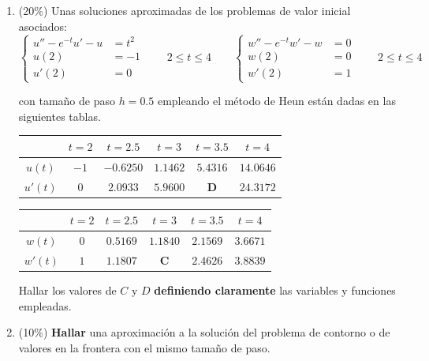 \documentclass[11pt]{article}
\begin{document}
\begin{enumerate}
\begin{enumerate}
\vspace{3cm}

\item{} (20\%) Unas soluciones aproximadas de los problemas de valor inicial asociados:
\[
\left\{
\begin{aligned}
u''-e^{-t}u'-u &= t^2\\
u(2)&=-1\\
u'(2)&=0
\end{aligned}
\right.
\qquad 2\leq t\leq 4
\qquad
\left\{
\begin{aligned}
w''-e^{-t}w'-w &= 0\\
w(2)&=0\\
w'(2)&=1
\end{aligned}
\right.
\qquad 2\leq t\leq 4
\]

\vspace{4pt}
\noindent con tamaño de paso $h=0.5$ empleando el método de Heun están dadas en las siguientes tablas.

\vspace{6pt}
\begin{center}
\begin{tabular}{|c|c|c|c|c|c|}
\hline
 & $t=2$ & $t=2.5$ & $t=3$ & $t=3.5$ & $t=4$ \\ \hline
$u(t)$ & $-1$ & $-0.6250$ & $1.1462$ & $5.4316$ & $14.0646$ \\ \hline
$u'(t)$ & $0$ & $2.0933$ & $5.9600$ & $\mathbf{D}$ & $24.3172$ \\ \hline
\end{tabular}

\vspace{6pt}
\begin{tabular}{|c|c|c|c|c|c|}
\hline
 & $t=2$ & $t=2.5$ & $t=3$ & $t=3.5$ & $t=4$ \\ \hline
$w(t)$ & $0$ & $0.5169$ & $1.1840$ & $2.1569$ & $3.6671$ \\ \hline
$w'(t)$ & $1$ & $1.1807$ & $\mathbf{C}$ & $2.4626$ & $3.8839$ \\ \hline
\end{tabular}
\end{center}

\vspace{4pt}
\noindent Hallar los valores de $C$ y $D$ \textbf{definiendo claramente} las variables y funciones empleadas.

\vspace{6cm}

\item{} (10\%) \textbf{Hallar} una aproximación a la solución del problema de contorno o de valores en la frontera con el mismo tamaño de paso.


\end{enumerate}
\end{enumerate}
\end{document}
